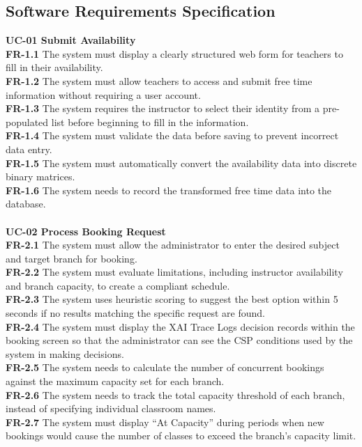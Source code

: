 \subsection{Software Requirements Specification}
\textbf{UC-01 Submit Availability} \\
\textbf{FR-1.1} The system must display a clearly structured web form for teachers to fill in their availability. \\
\textbf{FR-1.2} The system must allow teachers to access and submit free time information without requiring a user account. \\
\textbf{FR-1.3} The system requires the instructor to select their identity from a pre-populated list before beginning to fill in the information. \\
\textbf{FR-1.4} The system must validate the data before saving to prevent incorrect data entry. \\
\textbf{FR-1.5} The system must automatically convert the availability data into discrete binary matrices. \\
\textbf{FR-1.6} The system needs to record the transformed free time data into the database. \\
\\
\textbf{UC-02 Process Booking Request} \\
\textbf{FR-2.1} The system must allow the administrator to enter the desired subject and target branch for booking. \\
\textbf{FR-2.2} The system must evaluate limitations, including instructor availability and branch capacity, to create a compliant schedule. \\
\textbf{FR-2.3} The system uses heuristic scoring to suggest the best option within 5 seconds if no results matching the specific request are found. \\
\textbf{FR-2.4} The system must display the XAI Trace Logs decision records within the booking screen so that the administrator can see the CSP conditions used by the system in making decisions. \\
\textbf{FR-2.5} The system needs to calculate the number of concurrent bookings against the maximum capacity set for each branch. \\
\textbf{FR-2.6} The system needs to track the total capacity threshold of each branch, instead of specifying individual classroom names. \\
\textbf{FR-2.7} The system must display \enquote{At Capacity} during periods when new bookings would cause the number of classes to exceed the branch's capacity limit. \\
